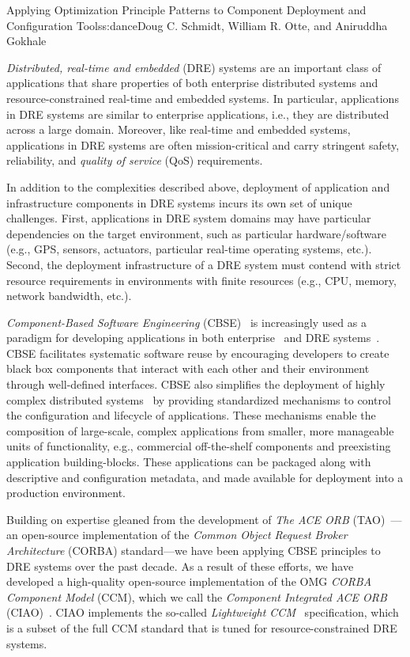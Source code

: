\begin{aosachapter}{Applying Optimization Principle Patterns to Component Deployment and
                    Configuration Tools}{s:dance}{Doug C. Schmidt, William R. Otte, and Aniruddha Gokhale}


\label{intro}

\emph{Distributed, real-time and embedded} (DRE) systems are an
important class of applications that share properties of both enterprise
distributed systems and resource-constrained real-time and embedded
systems. In particular, applications in DRE systems are similar to
enterprise applications, i.e., they are distributed across a large
domain. Moreover, like real-time and embedded systems, applications in
DRE systems are often mission-critical and carry stringent safety,
reliability, and \emph{quality of service} (QoS) requirements.

In addition to the complexities described above, deployment of
application and infrastructure components in DRE systems incurs its own
set of unique challenges. First, applications in DRE system domains may
have particular dependencies on the target environment, such as
particular hardware/software (e.g., GPS, sensors, actuators, particular
real-time operating systems, etc.). Second, the deployment
infrastructure of a DRE system must contend with strict resource
requirements in environments with finite resources (e.g., CPU, memory,
network bandwidth, etc.).

\emph{Component-Based Software Engineering} (CBSE)~\cite{Heineman:01} is
increasingly used as a paradigm for developing applications in both
enterprise~\cite{Karamcheti:05} and DRE systems~\cite{Schmidt:06d}. CBSE
facilitates systematic software reuse by encouraging developers to
create black box components that interact with each other and their
environment through well-defined interfaces. CBSE also simplifies the
deployment of highly complex distributed
systems~\cite{SchmidtSpringer:11g} by providing standardized mechanisms
to control the configuration and lifecycle of applications. These
mechanisms enable the composition of large-scale, complex applications
from smaller, more manageable units of functionality, e.g., commercial
off-the-shelf components and preexisting application building-blocks.
These applications can be packaged along with descriptive and
configuration metadata, and made available for deployment into a
production environment.

Building on expertise gleaned from the development of \emph{The ACE ORB}
(TAO)~\cite{Schmidt:02g}---an open-source implementation of the
\emph{Common Object Request Broker Architecture} (CORBA) standard---we
have been applying CBSE principles to DRE systems over the past decade.
As a result of these efforts, we have developed a high-quality
open-source implementation of the OMG \emph{CORBA Component Model}
(CCM), which we call the \emph{Component Integrated ACE ORB}
(CIAO)~\cite{CIAO}. CIAO implements the so-called \emph{Lightweight
CCM}~\cite{LWCCM-2004} specification, which is a subset of the full CCM
standard that is tuned for resource-constrained DRE systems.


\end{aosachapter}
